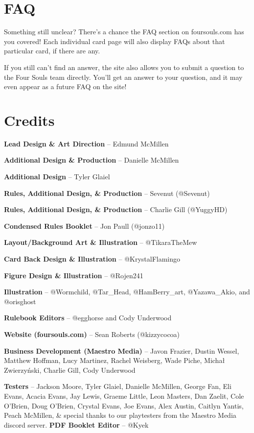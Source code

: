 \documentclass[10pt, a4paper, twoside]{article} %
\newcommand\blankpage{\null\thispagestyle{empty}\addtocounter{page}{-1}\newpage}
\begin{document}
    \section{FAQ}
    Something still unclear? There’s a chance the FAQ section on foursouls.com has you covered! Each individual card page will also display FAQs about that particular card, if there are any.

    If you still can’t find an answer, the site also allows you to submit a question to the Four Souls team directly. You’ll get an answer to your question, and it may even appear as a future FAQ on the site!

    \section{Credits}
    \textbf{Lead Design \& Art Direction} – Edmund McMillen

    \textbf{Additional Design \& Production} – Danielle McMillen

    \textbf{Additional Design} – Tyler Glaiel

    \textbf{Rules, Additional Design, \& Production} – Sevenut (@Sevenut)

    \textbf{Rules, Additional Design, \& Production} – Charlie Gill (@YuggyHD)

    \textbf{Condensed Rules Booklet} – Jon Paull (@jonzo11)

    \textbf{Layout/Background Art \& Illustration} – @TikaraTheMew

    \textbf{Card Back Design \& Illustration} – @KrystalFlamingo

    \textbf{Figure Design \& Illustration} – @Rojen241

    \textbf{Illustration} – @Wormchild, @Tar\_Head, @HamBerry\_art, @Yazawa\_Akio, and @orisghost
    
    \textbf{Rulebook Editors} – @egghorse and Cody Underwood
    
    \textbf{Website (foursouls.com)} – Sean Roberts (@kizzycocoa)
    
    \textbf{Business Development (Maestro Media)} – Javon Frazier, Dustin Wessel, Matthew Hoffman, Lucy Martinez, Rachel Weisberg, Wade Piche, Michał Zwierzyński, Charlie Gill, Cody Underwood
    
    \textbf{Testers} – Jackson Moore, Tyler Glaiel, Danielle McMillen, George Fan, Eli Evans, Acacia Evans, Jay Lewis, Graeme Little, Leon Masters, Dan Zaelit, Cole O’Brien, Doug O’Brien, Crystal Evans, Joe Evans, Alex Austin, Caitlyn Yantis, Peach McMillen, \& special thanks to our playtesters from the Maestro Media discord server.
    \vfill
    \textbf{PDF Booklet Editor} – @Kyek

    \afterpage{\blankpage}
    \afterpage{\blankpage}
    \afterpage{\blankpage}
    \afterpage{\blankpage}
\end{document}

